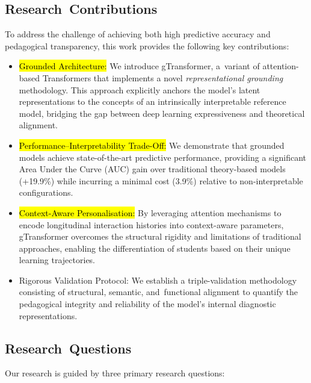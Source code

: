 \documentclass[applsci,article,accept,moreauthors,pdftex]{Definitions/mdpi}
\begin{document}
\subsection{Research~Contributions}
{To address the challenge of achieving both high predictive accuracy and pedagogical transparency, this work provides the following key contributions:}
\begin{itemize}
    \item \hl{Grounded Architecture:}
    {We introduce gTransformer, a~variant of attention-based Transformers that implements a novel \textit{representational grounding} methodology. This approach explicitly anchors the model's latent representations to the concepts of an intrinsically interpretable reference model, bridging the gap between deep learning expressiveness and theoretical alignment.}
    \item \hl{Performance--Interpretability Trade-Off:}
    {We demonstrate that grounded models achieve state-of-the-art predictive performance, providing a significant Area Under the Curve (AUC) gain over traditional theory-based models (+19.9\%) while incurring a minimal cost (3.9\%) relative to non-interpretable configurations.}
    \item \hl{Context-Aware Personalisation:}
    {By leveraging attention mechanisms to encode longitudinal interaction histories into context-aware parameters, gTransformer overcomes the structural rigidity and limitations of traditional approaches, enabling the differentiation of students based on their unique learning trajectories.}
    \item Rigorous Validation Protocol: {We establish a triple-validation methodology consisting of structural, semantic, and~functional alignment to quantify the pedagogical integrity and reliability of the model's internal diagnostic representations.}
\end{itemize}

\subsection{Research~Questions} \label{sec_rq}
Our research is guided by three primary research questions:
\end{document}
